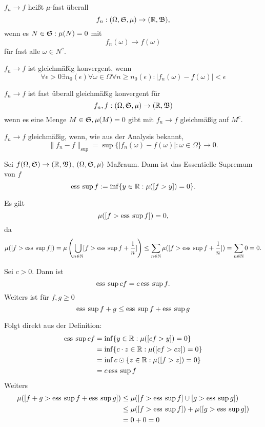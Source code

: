 			\begin{defi}
				$f_n\to f$ heißt $\mu$-fast überall
				\[ f_n: (\Omega,\mathfrak{S},\mu)\to(\mathbb{R},\mathfrak{B}), \]
				wenn es $N\in\mathfrak{S}:\mu(N)=0$ mit 
				\[ f_n(\omega)\to f(\omega) \]
				für fast alle $\omega\in N^c$. 
			\end{defi}
			
			\begin{defi}
				$f_n\to f$ ist gleichmäßig konvergent, wenn
				\[ \forall \epsilon>0\exists n_0(\epsilon)\forall \omega\in\Omega\forall n\ge n_0(\epsilon): |f_n(\omega)-f(\omega)|<\epsilon \]
			\end{defi}
			
			\begin{defi}
				$f_n\to f$ ist fast überall gleichmäßig konvergent für
				\[ f_n,f:(\Omega,\mathfrak{S},\mu)\to (\mathbb{R},\mathfrak{B}) \]
				wenn es eine Menge $M\in\mathfrak{S},\mu(M)=0$ gibt mit $f_n\to f$ gleichmäßig auf $M^c$. 
			\end{defi}
			
			\begin{bem}
				$f_n\to f$ gleichmäßig, wenn, wie aus der Analysis bekannt,
				\[ \lVert f_n-f\lVert_{\sup}=\sup\{|f_n(\omega)-f(\omega)|:\omega\in\Omega\}\to0. \]
			\end{bem}
			
			\begin{defi}
				Sei $f(\Omega,\mathfrak{S})\to(\mathbb{R},\mathfrak{B})$, $(\Omega,\mathfrak{S},\mu)$ Maßraum. Dann ist das Essentielle Supremum von $f$
				\[ \operatorname{ess\:\sup} f:=\inf\{y\in\mathbb{R}:\mu([f>y])=0\}. \]
			\end{defi}
			
			\begin{bem}
				Es gilt
				\[ \mu([f>\operatorname{ess\:\sup} f])=0, \]
				da
				\[ \mu([f>\operatorname{ess\:\sup} f])=\mu\left(\bigcup_{n\in\mathbb{N}} [f>\operatorname{ess\:\sup} f+\frac{1}{n}]\right)\le \sum_{n\in\mathbb{N}} \mu([f>\operatorname{ess\:\sup} f+\frac{1}{n}])=\sum_{n\in\mathbb{N}}0=0. \]
			\end{bem}
			
			\begin{satz}
				Sei $c>0$. Dann ist
				\[ \operatorname{ess\:\sup} cf=c\operatorname{ess\:\sup} f. \]
				Weiters ist für $f,g\ge 0$
				\[ \operatorname{ess\:\sup} f+g\le \operatorname{ess\:\sup} f+\operatorname{ess\:\sup} g \]
			\end{satz}
			\begin{bew}
				Folgt direkt aus der Definition:
				\begin{align*} \operatorname{ess\:\sup} cf&=\inf\{y\in\mathbb{R}: \mu([cf>y])=0\}\\&=\inf\{c\cdot z\in\mathbb{R}: \mu([cf>cz])=0\}\\&=\inf c\odot \{z\in\mathbb{R}: \mu([f>z])=0\}\\&=c\operatorname{ess\:\sup} f \end{align*}
				Weiters
				\begin{align*} \mu([f+g> \operatorname{ess\:\sup} f+\operatorname{ess\:\sup} g])&\le \mu([f>\operatorname{ess\:\sup} f]\cup[g>\operatorname{ess\:\sup} g])\\&\le\mu([f>\operatorname{ess\:\sup} f])+\mu([g>\operatorname{ess\:\sup} g])\\&=0+0=0 \end{align*}
			\end{bew}
			
